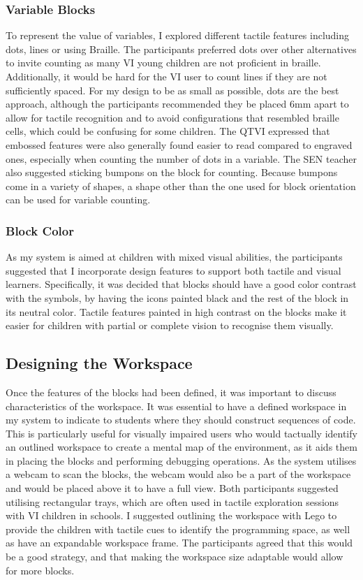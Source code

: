 \documentclass[oneside,%
                    author={Malak Hajji},
                    degree={BSc},
                    title={Designing An Accessible Ozobot Programming Platform for Students},
                  subtitle={With Mixed Visual Abilities}]{dissertation}
\begin{document}
\subsubsection{Variable Blocks}
To represent the value of variables, I explored different tactile features including dots, lines or using Braille.
The participants preferred dots over other alternatives to invite counting as many VI young children are not proficient in braille. Additionally, it would be hard for the VI user to count lines if they are not sufficiently spaced. For my design to be as small as possible, dots are the best approach, although the participants recommended they be placed 6mm apart to allow for tactile recognition and to avoid configurations that resembled braille cells, which could be confusing for some children. The QTVI expressed that embossed features were also generally found easier to read compared to engraved ones, especially when counting the number of dots in a variable. The SEN teacher also suggested sticking bumpons on the block for counting. Because bumpons come in a variety of shapes, a shape other than the one used for block orientation can be used for variable counting.

\subsubsection{Block Color}
As my system is aimed at children with mixed visual abilities, the participants suggested that I incorporate design features to support both tactile and visual learners. Specifically, it was decided that blocks should have a good color contrast with the symbols, by having the icons painted black and the rest of the block in its neutral color. Tactile features painted in high contrast on the blocks make it easier for children with partial or complete vision to recognise them visually.

\subsection{Designing the Workspace}
Once the features of the blocks had been defined, it was important to discuss characteristics of the workspace. It was essential to have a defined workspace in my system to indicate to students where they should construct sequences of code. This is particularly useful for visually impaired users who would tactually identify an outlined workspace to create a mental map of the environment, as it aids them in placing the blocks and performing debugging operations. As the system utilises a webcam to scan the blocks, the webcam would also be a part of the workspace and would be placed above it to have a full view. Both participants suggested utilising rectangular trays, which are often used in tactile exploration sessions with VI children in schools. I suggested outlining the workspace with Lego to provide the children with tactile cues to identify the programming space, as well as have an expandable workspace frame. The participants agreed that this would be a good strategy, and that making the workspace size adaptable would allow for more blocks.
\end{document}
